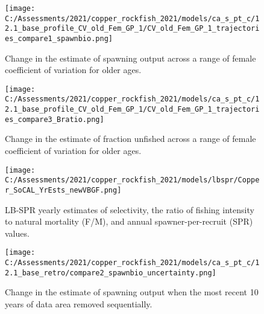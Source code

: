 \documentclass[11pt,
  english,
  a4paper,
]{article}
\begin{document}

\begin{figure}
\centering
\texttt{[image: C:/Assessments/2021/copper\_rockfish\_2021/models/ca\_s\_pt\_c/12.1\_base\_profile\_CV\_old\_Fem\_GP\_1/CV\_old\_Fem\_GP\_1\_trajectories\_compare1\_spawnbio.png]}
\caption{Change in the estimate of spawning output across a range of female coefficient of variation for older ages.\label{fig:cv-ssb}}
\end{figure}

\tagmcend\tagstructend


\begin{figure}
\centering
\texttt{[image: C:/Assessments/2021/copper\_rockfish\_2021/models/ca\_s\_pt\_c/12.1\_base\_profile\_CV\_old\_Fem\_GP\_1/CV\_old\_Fem\_GP\_1\_trajectories\_compare3\_Bratio.png]}
\caption{Change in the estimate of fraction unfished across a range of female coefficient of variation for older ages.\label{fig:cv-depl}}
\end{figure}

\tagmcend\tagstructend

\clearpage


\begin{figure}
\centering
\texttt{[image: C:/Assessments/2021/copper\_rockfish\_2021/models/lbspr/Copper\_SoCAL\_YrEsts\_newVBGF.png]}
\caption{LB-SPR yearly estimates of selectivity, the ratio of fishing intensity to natural mortality (F/M), and annual spawner-per-recruit (SPR) values.\label{fig:lbspr}}
\end{figure}

\tagmcend\tagstructend

\newpage


\begin{figure}
\centering
\texttt{[image: C:/Assessments/2021/copper\_rockfish\_2021/models/ca\_s\_pt\_c/12.1\_base\_retro/compare2\_spawnbio\_uncertainty.png]}
\caption{Change in the estimate of spawning output when the most recent 10 years of data area removed sequentially.\label{fig:retro-ssb}}
\end{figure}
\end{document}
